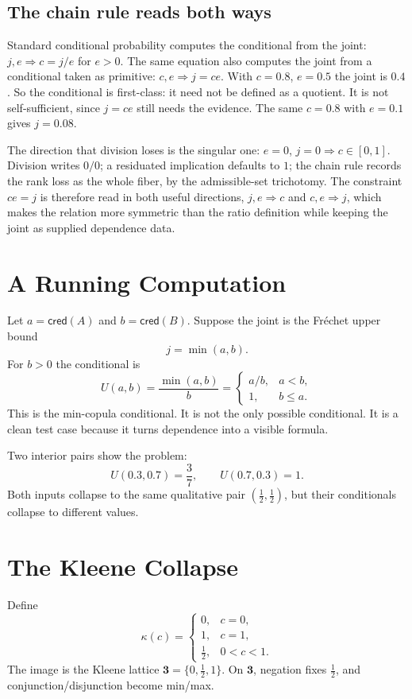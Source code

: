 \documentclass[11pt,a4paper]{article}
\newcommand{\cred}{\mathsf{cred}}
\newcommand{\collapse}{\kappa}
\newcommand{\half}{\tfrac12}
\newcommand{\three}{\mathbf{3}}
\begin{document}
\subsection{The chain rule reads both ways}
Standard conditional probability computes the conditional from the
joint: $j,e\Rightarrow c=j/e$ for $e>0$.  The same equation also
computes the joint from a conditional taken as primitive:
$c,e\Rightarrow j=ce$.  With $c=0.8$, $e=0.5$ the joint is $0.4$.  So
the conditional is first-class: it need not be defined as a quotient.
It is not self-sufficient, since $j=ce$ still needs the evidence.  The
same $c=0.8$ with $e=0.1$ gives $j=0.08$.

The direction that division loses is the singular one:
$e=0$, $j=0\Rightarrow c\in[0,1]$.  Division writes $0/0$; a residuated
implication defaults to $1$; the chain rule records the rank loss as the
whole fiber, by the admissible-set trichotomy.  The constraint
$ce=j$ is therefore read in both useful directions,
$j,e\Rightarrow c$ and $c,e\Rightarrow j$, which makes the relation more
symmetric than the ratio definition while keeping the joint as supplied
dependence data.

\section{A Running Computation}

Let $a=\cred(A)$ and $b=\cred(B)$.  Suppose the joint is the
Fr\'echet upper bound
\[
  j=\min(a,b).
\]
For $b>0$ the conditional is
\[
  U(a,b)=\frac{\min(a,b)}{b}
  =
  \begin{cases}
  a/b, & a<b,\\
  1, & b\le a.
  \end{cases}
\]
This is the min-copula conditional.  It is not the only possible
conditional.  It is a clean test case because it turns dependence into
a visible formula.

Two interior pairs show the problem:
\[
  U(0.3,0.7)=\frac37,\qquad
  U(0.7,0.3)=1.
\]
Both inputs collapse to the same qualitative pair
$(\half,\half)$, but their conditionals collapse to different values.

\section{The Kleene Collapse}

Define
\[
\collapse(c)=
\begin{cases}
0,&c=0,\\
1,&c=1,\\
\half,&0<c<1.
\end{cases}
\]
The image is the Kleene lattice $\three=\{0,\half,1\}$.
On $\three$, negation fixes $\half$, and conjunction/disjunction
become min/max.
\end{document}

